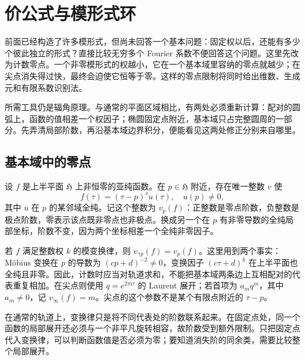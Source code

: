\section{价公式与模形式环}
\label{b3:sec:2305}

前面已经构造了许多模形式，但尚未回答一个基本问题：固定权以后，还能有多少个彼此独立的形式？直接比较无穷多个 Fourier 系数不便回答这个问题。这里先改为计数零点。一个非零模形式的权越小，它在一个基本域里容纳的零点就越少；在尖点消失得过快，最终会迫使它恒等于零。这样的零点限制将同时给出维数、生成元和有限系数识别法。

\ProseParagraphBreak

所需工具仍是辐角原理。与通常的平面区域相比，有两处必须重新计算：配对的圆弧上，函数的值相差一个权因子；椭圆固定点附近，基本域只占完整圆周的一部分。先弄清局部阶数，再沿基本域边界积分，便能看见这两处修正分别来自哪里。

\subsection{基本域中的零点}
\label{b3:subsec:230501}

设 \(f\) 是上半平面 \(\mathfrak H\) 上非恒零的亚纯函数。在 \(p\in\mathfrak H\) 附近，存在唯一整数 \(v\) 使
\[
 f(\tau)=(\tau-p)^v u(\tau),\quad u(p)\ne0,
\]
其中 \(u\) 在 \(p\) 的某邻域全纯。记这个整数为 \(v_p(f)\)：正整数是零点阶数，负整数是极点阶数，零表示该点既非零点也非极点。换成另一个在 \(p\) 有非零导数的全纯局部坐标，阶数不变，因为两个坐标相差一个全纯非零因子。

\ProseParagraphBreak

若 \(f\) 满足整数权 \(k\) 的模变换律，则 \(v_{\gamma p}(f)=v_p(f)\)。这里用到两个事实：Möbius 变换在 \(p\) 的导数为 \((cp+d)^{-2}\ne0\)，变换因子 \((c\tau+d)^k\) 在上半平面也全纯且非零。因此，计数时应当对轨道求和，不能把基本域两条边上互相配对的代表重复相加。在尖点则使用 \(q=e^{2\pi\mathrm{i}\tau}\) 的 Laurent 展开；若首项为 \(a_mq^m\)，其中 \(a_m\ne0\)，记 \(v_\infty(f)=m\)。尖点的这个参数不是某个有限点附近的 \(\tau-p\)。

\ProseParagraphBreak

在通常的轨道上，变换律只是将不同代表处的阶数联系起来。在固定点处，同一个函数的局部展开还必须与一个非平凡旋转相容，故阶数受到额外限制。只把固定点代入变换律，可以判断函数值是否必须为零；要知道消失阶的同余类，需要比较整个局部展开。

